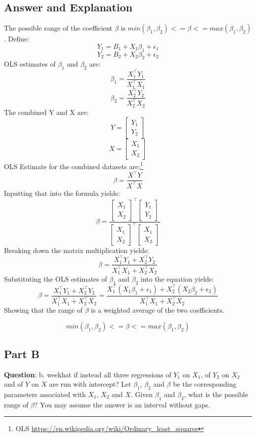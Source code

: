\documentclass{article}
\begin{document}
\subsection*{Answer and Explanation}
The possible range of the coefficient $\beta$ is $min(\beta_1,\beta_2) <= \beta <= max(\beta_1,\beta_2)$.\newline 
Define:\newline  
$$Y_1 = B_1 + X_1\beta_1 + \epsilon_1$$
$$Y_2 = B_2 + X_2\beta_2 + \epsilon_2$$
OLS estimates of $\beta_1$ and $\beta_2$ are: 
$$ \beta_1 = \frac{X_1 ^\top Y_1}{X_1 ^\top X_1}$$
$$ \beta_2 = \frac{X_2 ^\top Y_2}{X_2 ^\top X_2}$$
The combined Y and X are: 
$$Y = \begin{bmatrix} Y_1 \\ Y_2 \end{bmatrix}$$
$$X = \begin{bmatrix} X_1 \\ X_2 \end{bmatrix}$$
OLS Estimate for the combined datasets are:\footnote[1]{OLS \url{https://en.wikipedia.org/wiki/Ordinary_least_squares}}
$$ \beta = \frac{X ^\top Y}{X ^\top X}$$
Inputting that into the formula yields:
$$ \beta = \frac{\begin{bmatrix} X_1 \\ X_2 \end{bmatrix} ^\top \begin{bmatrix} Y_1 \\ Y_2 \end{bmatrix}}{\begin{bmatrix} X_1 \\ X_2 \end{bmatrix} ^\top \begin{bmatrix} X_1 \\ X_2 \end{bmatrix}}$$
Breaking down the matrix multiplication yields:
$$ \beta = \frac{X_1 ^\top Y_1 + X_2 ^\top Y_2}{X_1 ^\top X_1 + X_2 ^\top X_2}$$
Substituting the OLS estimates of $\beta_1$ and $\beta_2$ into the equation yields:
$$ \beta = \frac{X_1 ^\top Y_1 + X_2 ^\top Y_2}{X_1 ^\top X_1 + X_2 ^\top X_2} = \frac{X_1 ^\top (X_1\beta_1 + \epsilon_1) + X_2 ^\top (X_2\beta_2 + \epsilon_2)}{X_1 ^\top X_1 + X_2 ^\top X_2}$$
Showing that the range of $\beta$ is a weighted average of the two coefficients.

$$min(\beta_1,\beta_2) <= \beta <= max(\beta_1,\beta_2)$$

\subsection*{Part B}
\textbf{Question}: b. weekhat if instead all three regressions of $Y_1$ on $X_1$, of $Y_2$ on $X_2$ and of $Y$ on $X$ are run with intercept? 
Let $\beta_1$, $\beta_2$ and $\beta$ be the corresponding parameters associated with $X_1$, $X_2$ and $X$. 
Given $\beta_1$ and $\beta_2$, what is the possible range of $\beta$? You may assume the answer is an interval without gaps.
\end{document}
